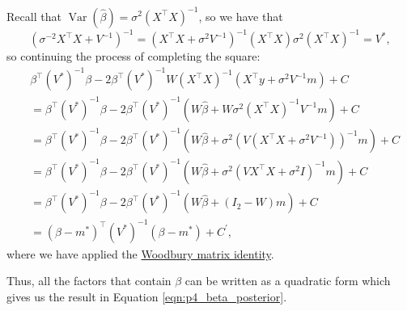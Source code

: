 \documentclass[letterpaper,11pt]{article}
\begin{document}
\begin{enumerate}
\begin{enumerate}
\begin{description}
      Recall that
      $\operatorname{Var}\left(\hat{\beta}\right) = \sigma^2\left(X^\intercal
        X\right)^{-1}$, so we have that
      \begin{equation*}
        \left(\sigma^{-2}X^\intercal X + V^{-1}\right)^{-1}
        = \left(X^\intercal X + \sigma^{2}V^{-1}\right)^{-1}\left(X^\intercal X\right)
        \sigma^2\left(X^\intercal X\right)^{-1} = V^*,
      \end{equation*}
      so continuing the process of completing the square:
      \begin{align*}
        &\beta^\intercal\left(V^*\right)^{-1}\beta -
          2\beta^\intercal\left(V^*\right)^{-1}
          W\left(X^\intercal X\right)^{-1}\left(X^\intercal y + \sigma^2 V^{-1}m\right) + C \\
        &= \beta^\intercal\left(V^*\right)^{-1}\beta -
          2\beta^\intercal\left(V^*\right)^{-1}\left(
          W\hat\beta + W\sigma^2\left(X^\intercal X\right)^{-1}V^{-1}m
          \right) + C \\
        &= \beta^\intercal\left(V^*\right)^{-1}\beta
          - 2\beta^\intercal\left(V^*\right)^{-1}\left(
          W\hat\beta + \sigma^2\left(V\left(X^\intercal X + \sigma^2V^{-1}\right)\right)^{-1}m
          \right) + C \\
        &= \beta^\intercal\left(V^*\right)^{-1}\beta
          - 2\beta^\intercal\left(V^*\right)^{-1}\left(
          W\hat\beta + \sigma^2\left(VX^\intercal X + \sigma^2I\right)^{-1}m
          \right) + C \\
        &= \beta^\intercal\left(V^*\right)^{-1}\beta
          - 2\beta^\intercal\left(V^*\right)^{-1}\left(
          W\hat\beta + \left(I_2 - W\right)m\right) + C \\
        &= \left(\beta - m^*\right)^\intercal \left(V^*\right)^{-1}\left(\beta - m^*\right)
           + C^\prime,
      \end{align*}
      where we have applied the
      \href{https://en.wikipedia.org/wiki/Woodbury\_matrix\_identity}{Woodbury
        matrix identity}.

      Thus, all the factors that contain $\beta$ can be written as a quadratic
      form which gives us the result in Equation \ref{eqn:p4_beta_posterior}.
    \end{description}
  \end{enumerate}
  
\end{enumerate}
\end{document}
